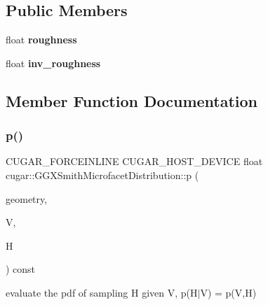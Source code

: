 \subsection*{Public Members}
\begin{DoxyCompactItemize}
\item 
\mbox{\label{structcugar_1_1_g_g_x_smith_microfacet_distribution_a7a150226563be81c10b2dec2aa0384e9}} 
float {\bfseries roughness}
\item 
\mbox{\label{structcugar_1_1_g_g_x_smith_microfacet_distribution_a771e0e5255287fd44206448daaeb2dc1}} 
float {\bfseries inv\+\_\+roughness}
\end{DoxyCompactItemize}


\subsection{Member Function Documentation}
\mbox{\label{structcugar_1_1_g_g_x_smith_microfacet_distribution_a5ab852daebbd282ab41c8003bbf02c51}} 
\subsubsection{\texorpdfstring{p()}{p()}}
{\footnotesize\ttfamily C\+U\+G\+A\+R\+\_\+\+F\+O\+R\+C\+E\+I\+N\+L\+I\+NE C\+U\+G\+A\+R\+\_\+\+H\+O\+S\+T\+\_\+\+D\+E\+V\+I\+CE float cugar\+::\+G\+G\+X\+Smith\+Microfacet\+Distribution\+::p (\begin{DoxyParamCaption}\item[{const \hyperlink{structcugar_1_1_differential_geometry}{Differential\+Geometry} \&}]{geometry,  }\item[{const \hyperlink{structcugar_1_1_vector}{Vector3f}}]{V,  }\item[{const \hyperlink{structcugar_1_1_vector}{Vector3f}}]{H }\end{DoxyParamCaption}) const\hspace{0.3cm}{\ttfamily [inline]}}

evaluate the pdf of sampling H given V, p(H$\vert$V) = p(\+V,\+H) \mbox{\label{structcugar_1_1_g_g_x_smith_microfacet_distribution_ad985938cdb73621b83bd28664395dc0e}} 

